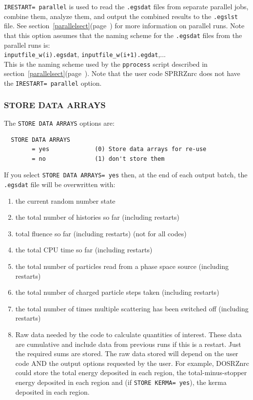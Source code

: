 \documentclass[12pt,twoside]{article}  %
\newcommand{\lpage}[1]{(page~\pageref{#1})}
\begin{document}
{\tt IRESTART= parallel} is used to read the {\tt .egsdat} files from
separate parallel jobs, combine them, analyze them, and output the 
combined results to the {\tt .egslst} file.  See
section~\ref{parallelsect}\lpage{parallelsect} 
for more information on parallel runs.  Note that this option assumes
that the naming scheme for the {\tt .egsdat} files from the parallel runs
is:\\
{\tt inputfile\_w(i).egsdat}, {\tt inputfile\_w(i+1).egdat},... \\
This is the naming scheme used by the {\tt pprocess} script described
in section~\ref{parallelsect}\lpage{parallelsect}.  Note that the user
code SPRRZnrc does not have the {\tt IRESTART= parallel} option.

\subsubsection{STORE DATA ARRAYS}
\label{dataarrsect}

The {\tt STORE DATA ARRAYS} options are:

\begin{verbatim}
  STORE DATA ARRAYS
        = yes             (0) Store data arrays for re-use
        = no              (1) don't store them
\end{verbatim}

If you select {\tt STORE DATA ARRAYS= yes} then, at the end of each output 
batch, the {\tt .egsdat} file will be overwritten with:

\begin{enumerate}
\item the current random number state
\item the total number of histories so far (including restarts)
\item total fluence so far (including restarts) (not for all codes)
\item the total CPU time so far (including restarts)
\item the total number of particles read from a phase space source 
        (including restarts)
\item the total number of charged particle steps taken (including restarts)
\item the total number of times multiple scattering has been switched off
      (including restarts)
\item Raw data needed by the code to calculate quantities of interest.
      These data are cumulative and include data from previous runs if
      this is a restart.  Just the required sums are stored.  The raw
      data stored will depend on the user code AND the output options
      requested by the user.  For example, DOSRZnrc could store the
      total energy deposited in each region, the total-minus-stopper
      energy deposited in each region and (if {\tt STORE KERMA= yes}),
      the kerma deposited in each region.
\end{enumerate}
\end{document}

